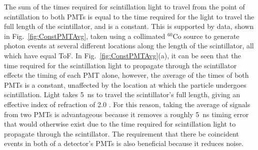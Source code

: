 The sum of the times required for scintillation light to travel from the point of scintillation to both PMTs is equal to the time required for the light to travel the full length of the scintillator, and is a constant.
This is supported by data, shown in Fig.~\ref{fig:ConstPMTAvg}, taken using a collimated $^{60}$Co source to generate photon events at several different locations along the length of the scintillator, all which have equal ToF.
In Fig.~\ref{fig:ConstPMTAvg}(a), it can be seen that the time required for the scintillation light to propagate through the scintillator effects the timing of each PMT alone, however, the average of the times of both PMTs is a constant, unaffected by the location at which the particle undergoes scintillation.
Light takes 5~ns to travel the scintillator's full length, giving an effective index of refraction of 2.0 .
For this reason, taking the average of signals from two PMTs is advantageous because it removes a roughly 5~ns timing error that would otherwise exist due to the time required for scintillation light to propagate through the scintillator.
The requirement that there be coincident events in both of a detector's PMTs is also beneficial because it reduces noise.
